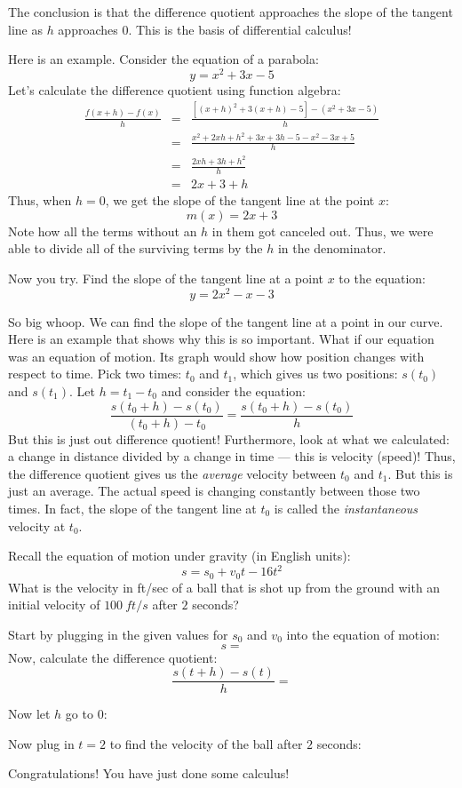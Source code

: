 \documentclass[letterpaper,12pt,fleqn]{article}
\begin{document}
\vspace{1in}

The conclusion is that the difference quotient approaches the slope of the tangent line
as $h$ approaches $0$. This is the basis of differential calculus!

Here is an example. Consider the equation of a parabola:
\[y=x^2+3x-5\]
Let's calculate the difference quotient using function algebra:
\begin{eqnarray*}
  \frac{f(x+h)-f(x)}{h} &=& \frac{[(x+h)^2+3(x+h)-5]-(x^2+3x-5)}{h} \\
  &=& \frac{x^2+2xh+h^2+3x+3h-5-x^2-3x+5}{h} \\
  &=& \frac{2xh+3h+h^2}{h} \\
  &=& 2x+3+h
\end{eqnarray*}
Thus, when $h=0$, we get the slope of the tangent line at the point $x$:
\[m(x)=2x+3\]
Note how all the terms without an $h$ in them got canceled out. Thus, we were able to
divide all of the surviving terms by the $h$ in the denominator.

\newpage

Now you try. Find the slope of the tangent line at a point $x$ to the equation:
\[y=2x^2-x-3\]

\vspace{4in}

So big whoop. We can find the slope of the tangent line at a point in our curve. Here is
an example that shows why this is so important. What if our equation was an equation
of motion. Its graph would show how position changes with respect to time. Pick two
times: $t_0$ and $t_1$, which gives us two positions: $s(t_0)$ and $s(t_1)$. Let
$h=t_1-t_0$ and consider the equation:
\[\frac{s(t_0+h)-s(t_0)}{(t_0+h)-t_0}=\frac{s(t_0+h)-s(t_0)}{h}\]
But this is just out difference quotient! Furthermore, look at what we calculated: a
change in distance divided by a change in time --- this is velocity (speed)! Thus, the
difference quotient gives us the \emph{average} velocity between $t_0$ and $t_1$. But
this is just an average. The actual speed is changing constantly between those two times.
In fact, the slope of the tangent line at $t_0$ is called the \emph{instantaneous}
velocity at $t_0$.

Recall the equation of motion under gravity (in English units):
\[s=s_0+v_0t-16t^2\]
What is the velocity in ft/sec of a ball that is shot up from the ground with an
initial velocity of $\SI{100}{ft/s}$ after $2$ seconds?

Start by plugging in the given values for $s_0$ and $v_0$ into the equation of motion:
\[s=\]
Now, calculate the difference quotient:
\[\frac{s(t+h)-s(t)}{h}=\]

\vspace{4in}

Now let $h$ go to $0$:

\vspace{1in}

Now plug in $t=2$ to find the velocity of the ball after $2$ seconds:

\vspace{1in}

Congratulations! You have just done some calculus!
\end{document}
